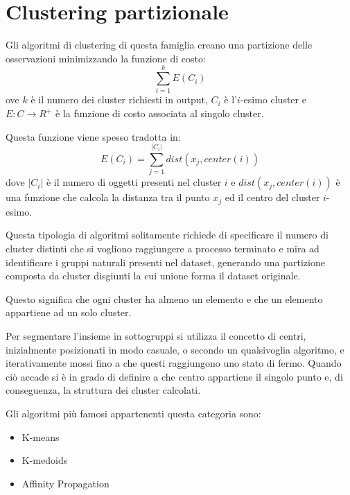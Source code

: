 \section{Clustering partizionale}
	Gli algoritmi di clustering di questa famiglia creano una partizione delle osservazioni minimizzando la funzione di costo:
	\begin{equation*}
	  \sum_{i=1}^{k}{E(C_i)}
	\end{equation*}
	ove $k$ è il numero dei cluster richiesti in output, $C_i$ è l'$i$-esimo cluster e $E:C \rightarrow R^{+}$ è la funzione di costo associata al singolo cluster\cite{clustering_partizionale}.

	Questa funzione viene spesso tradotta in\cite{funzione_costo}:
	\begin{equation*}
	  	E(C_i) = \sum_{j=1}^{|C_i|}{dist(x_j, center(i))}
	\end{equation*}
dove $|C_i|$ è il numero di oggetti presenti nel cluster $i$ e $dist(x_j, center(i))$ è una funzione che calcola la distanza tra il punto $x_j$ ed il centro del cluster $i$-esimo.

	Questa tipologia di algoritmi solitamente richiede di specificare il numero di cluster distinti che si vogliono raggiungere a processo terminato e mira ad identificare i gruppi naturali presenti nel dataset, generando una partizione composta da cluster disgiunti la cui unione forma il dataset originale.

	Questo significa che ogni cluster ha almeno un elemento e che un elemento appartiene ad un solo cluster.

	Per segmentare l'insieme in sottogruppi si utilizza il concetto di centri, inizialmente posizionati in modo casuale, o secondo un qualsivoglia algoritmo, e iterativamente mossi fino a che questi raggiungono uno stato di fermo. Quando ciò accade si è in grado di definire a che centro appartiene il singolo punto e, di conseguenza, la struttura dei cluster calcolati. 

	Gli algoritmi più famosi appartenenti questa categoria sono: 
	\begin{itemize}
	  	\item K-means
	  	\item K-medoids
	  	\item Affinity Propagation
	\end{itemize}
